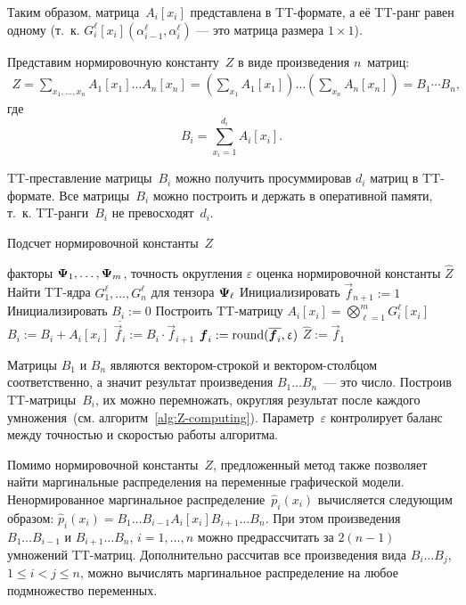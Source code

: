Таким образом, матрица~$A_i[x_i]$ представлена в TT\hyp{}формате, а её TT\hyp{}ранг равен одному (т.~к. $G^{\ell}_i[x_i](\alpha^{\ell}_{i - 1}, \alpha^{\ell}_i)$ --- это матрица размера $1 \times 1$).

Представим нормировочную константу~$Z$ в виде произведения $n$~матриц:
\begin{multline*}
Z = \sum_{x_1, \dots, x_n}  A_1[x_1] \ldots  A_n[x_n]
= \left ( \sum_{x_1} A_1[x_1] \right ) \ldots  \left ( \sum_{x_n} A_n[x_n] \right ) = B_1 \dotsm  B_n,
\end{multline*}
где
\begin{equation*}
B_i = \sum_{x_i = 1}^{d_i} A_i[x_i].
\end{equation*}

TT\hyp{}преставление матрицы~$B_i$ можно получить просуммировав $d_i$ матриц в TT\hyp{}формате. Все матрицы~$B_i$ можно построить и держать в оперативной памяти, т.~к. TT\hyp{}ранги~$B_i$ не превосходят~$d_i$.

\begin{algorithm}[tb]
   \caption{Подсчет нормировочной константы~$Z$}
   \label{alg:Z-computing}
\begin{algorithmic}[1]
   \REQUIRE факторы $\boldsymbol{\Psi}_1, \dots, \boldsymbol{\Psi}_m$, точность округления $\varepsilon$
   \ENSURE оценка нормировочной константы $\widehat{Z}$
   \STATE Найти TT\hyp{}ядра $G^{\ell}_1, \dots, G^{\ell}_n$ для тензора $\boldsymbol{\Psi}_{\ell}$
   \ENDFOR
   \STATE Инициализировать $\vec{f}_{n + 1} := 1$
     \STATE Инициализировать $B_i := 0$
       \STATE Построить TT\hyp{}матрицу $A_i[x_i] = \bigotimes_{\ell = 1}^m G^\ell_i[x_i]$
       \STATE $B_i := B_i + A_i[x_i]$
     \ENDFOR
     \STATE $\overline{\vec{f}_i} := B_i \cdot \vec{f}_{i + 1}$
     \STATE $\boldsymbol{f}_i := \operatorname{round}(\overline{\boldsymbol{f}_i}, \upvarepsilon)$
   \ENDFOR
   \STATE $\widehat{Z} := \vec{f}_1$
\end{algorithmic}
\end{algorithm}

Матрицы $B_1$ и $B_n$ являются вектором-строкой и вектором-столбцом соответственно, а значит результат произведения $B_1 \ldots B_n$~--- это число.
Построив TT\hyp{}матрицы~$B_i$, их можно перемножать, округляя результат после каждого умножения~(см. алгоритм~\ref{alg:Z-computing}). Параметр~$\varepsilon$ контролирует баланс между точностью и скоростью работы алгоритма.

Помимо нормировочной константы~$Z$, предложенный метод также позволяет найти маргинальные распределения на переменные графической модели. Ненормированное маргинальное распределение~$\hat{p}_i(x_i)$ вычисляется следующим образом:
$
\hat{p}_i(x_i) = B_1\ldots B_{i-1} A_i[x_i] B_{i+1}\ldots B_{n}.
$
При этом произведения~$B_1\ldots B_{i-1}$ и $B_{i+1}\ldots B_{n}$, $i=1,\ldots,n$ можно предрассчитать за $2 (n - 1)$ умножений TT\hyp{}матриц. Дополнительно рассчитав все произведения вида $B_i\ldots B_j$, $1 \leq i < j \leq n$, можно вычислять маргинальное распределение на любое подмножество переменных.

